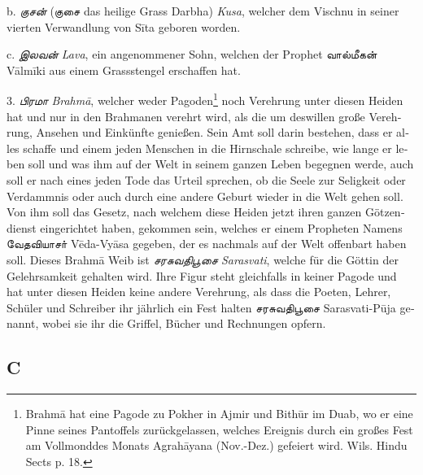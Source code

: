 \documentclass{article}
\newcommand{\TamilText}[1]{\texttamil{#1}}
\newcommand{\TamilItalic}[1]{\texttamil{\emph{#1}}}
\newcommand{\tam}[1]{\TamilText{#1}}
\newcommand{\tamitalic}[1]{\TamilItalic{#1}}
\begin{document}
{\textgerman{b}. \tamitalic{குசன்} (\tam{குசை} \textgerman{das heilige Grass Darbha) \emph{Kusa}, welcher dem Vischnu in seiner vierten Verwandlung von S\={i}ta geboren worden.}

\textgerman{c}. \tamitalic{இலவன்} \emph{\textgerman{Lava}}, \textgerman{ein angenommener Sohn, welchen der Prophet \tam{வால்மீகன்} V\={a}lm\={i}ki aus einem Grassstengel erschaffen hat.}

\bigskip

3. \tamitalic{பிரமா} \emph{\textgerman{Brahm\={a}}}, \textgerman{welcher weder Pagoden\footnote{Brahm\={a} hat eine Pagode zu Pokher in Ajmir und Bith\={u}r im Duab, wo er eine Pinne seines Pantoffels zurückgelassen, welches Ereignis durch ein großes Fest am Vollmonddes Monats Agrah\={a}yana (Nov.-Dez.) gefeiert wird. Wils. Hindu Sects p. 18.} noch Verehrung unter diesen Heiden hat und nur in den Brahmanen verehrt wird, als die um deswillen große Verehrung, Ansehen und Einkünfte genießen. Sein Amt soll darin bestehen, dass er alles schaffe und einem jeden Menschen in die Hirnschale schreibe, wie lange er leben soll und was ihm auf der Welt in seinem ganzen Leben begegnen werde, auch soll er nach eines jeden Tode das Urteil sprechen, ob die Seele zur Seligkeit oder Verdammnis oder auch durch eine andere Geburt wieder in die Welt gehen soll. Von ihm soll das Gesetz, nach welchem diese Heiden jetzt ihren ganzen Götzendienst eingerichtet haben, gekommen sein, welches er einem Propheten Namens \tam{வேதவியாசா்} V\={e}da-Vy\={a}sa gegeben, der es nachmals auf der Welt offenbart haben soll. Dieses Brahm\={a} Weib ist} \tamitalic{சரசுவதிபூசை} \emph{\textgerman{Sarasvati}}, \textgerman{welche für die Göttin der Gelehrsamkeit gehalten wird. Ihre Figur steht gleichfalls in keiner Pagode und hat unter diesen Heiden keine andere Verehrung, als dass die Poeten, Lehrer, Schüler und Schreiber ihr jährlich ein Fest halten \tam{சரசுவதிபூசை} Sarasvati-P\={u}ja genannt, wobei sie ihr die Griffel, Bücher und Rechnungen opfern.}

\subsection*{\textgerman{C}}
}
\end{document}
